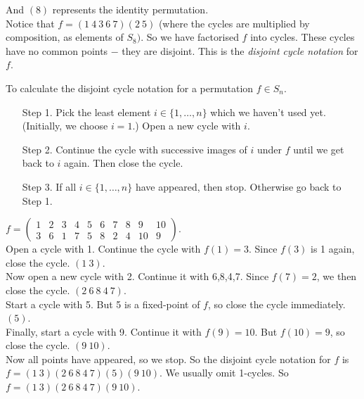 And $(8)$ represents the identity permutation.\\


Notice that $f =  (1~4~3~6~7)(2~5)$ (where the cycles are multiplied by composition, as elements of $S_8)$. So we have factorised $f$ into cycles. These cycles have no common points $-$ they are disjoint. This is the \emph{disjoint cycle notation} for $f$.\\


\begin{method}To calculate the disjoint cycle notation for a permutation $f \in S_n$.\begin{enumerate}

\item[Step 1.] Pick the least element $i \in \{1,\dots,n\}$ which  we haven't used yet. (Initially, we choose $i=1$.) Open a new cycle with $i$. 

\item[Step 2.] Continue the cycle with successive images of $i$ under $f$ until we get back to $i$ again. Then close the cycle.

\item[Step 3.] If all $i \in \{1,\dots,n\}$ have appeared, then stop. Otherwise go back to Step 1.

\end{enumerate}
\end{method}\vspace*{10pt}

\begin{examples}$f = \begin{pmatrix}
1 & 2 & 3 & 4 & 5 & 6 & 7 & 8 & 9 & 10\\
3 & 6 & 1 & 7 & 5 & 8 & 2 & 4 & 10 & 9	
\end{pmatrix}$. \\

Open a cycle with 1. Continue the cycle with $f(1) = 3$. Since $f(3)$ is 1 again, close the cycle. $(1~3)$. \\

Now open a new cycle with 2. Continue it with 6,8,4,7. Since $f(7) = 2$, we then close the cycle. $(2~6~8~4~7)$. \\

Start a cycle with 5. But 5 is a fixed-point of $f$, so close the cycle immediately. $(5)$.\\

Finally, start a cycle with 9. Continue it with $f(9) = 10$. But $f(10) = 9$, so close the cycle. $(9~10)$.\\

Now all points have appeared, so we stop. So the disjoint cycle notation for $f$ is $f = (1~3)(2~6~8~4~7)(5)(9~10)$. We usually omit 1-cycles. So $f = (1~3)(2~6~8~4~7)(9~10)$.
\end{examples}\vspace*{10pt}

